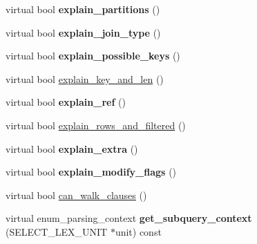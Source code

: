 \begin{DoxyCompactItemize}
virtual bool {\bfseries explain\+\_\+partitions} ()
\item 
\mbox{\label{classExplain_a8c363cf024027cb51295659924e6b530}} 
virtual bool {\bfseries explain\+\_\+join\+\_\+type} ()
\item 
\mbox{\label{classExplain_a0b899b181c5fa1395b5dff20f4a2788e}} 
virtual bool {\bfseries explain\+\_\+possible\+\_\+keys} ()
\item 
virtual bool \mbox{\hyperlink{classExplain_a2a0e775012360ec5f276373e535e2059}{explain\+\_\+key\+\_\+and\+\_\+len}} ()
\item 
\mbox{\label{classExplain_a6324714f259b1a0a4b1a654c24b2364b}} 
virtual bool {\bfseries explain\+\_\+ref} ()
\item 
virtual bool \mbox{\hyperlink{classExplain_a1c2766929ff005124f8f14ce33e15f34}{explain\+\_\+rows\+\_\+and\+\_\+filtered}} ()
\item 
\mbox{\label{classExplain_a747d7f56f1ba869d60a4b54f79b96039}} 
virtual bool {\bfseries explain\+\_\+extra} ()
\item 
\mbox{\label{classExplain_a638bfc1b0974e21a95c7f0e027d8a00b}} 
virtual bool {\bfseries explain\+\_\+modify\+\_\+flags} ()
\item 
virtual bool \mbox{\hyperlink{classExplain_a82fdfa033238cfb356903c475ef4a177}{can\+\_\+walk\+\_\+clauses}} ()
\item 
\mbox{\label{classExplain_af0bdd8d2f98fe5cf0f31a75b00982428}} 
virtual enum\+\_\+parsing\+\_\+context {\bfseries get\+\_\+subquery\+\_\+context} (S\+E\+L\+E\+C\+T\+\_\+\+L\+E\+X\+\_\+\+U\+N\+IT $\ast$unit) const
\end{DoxyCompactItemize}
